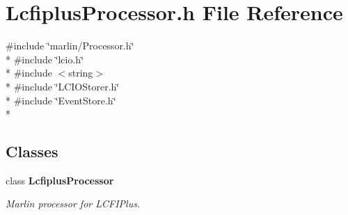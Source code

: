 \section{Lcfiplus\-Processor.\-h File Reference}
\label{LcfiplusProcessor_8h}
{\ttfamily \#include \char`\"{}marlin/\-Processor.\-h\char`\"{}}\\*
{\ttfamily \#include \char`\"{}lcio.\-h\char`\"{}}\\*
{\ttfamily \#include $<$string$>$}\\*
{\ttfamily \#include \char`\"{}L\-C\-I\-O\-Storer.\-h\char`\"{}}\\*
{\ttfamily \#include \char`\"{}Event\-Store.\-h\char`\"{}}\\*
\subsection*{Classes}
\begin{DoxyCompactItemize}
\item 
class {\bf Lcfiplus\-Processor}
\begin{DoxyCompactList}\small\item\em Marlin processor for L\-C\-F\-I\-Plus. \end{DoxyCompactList}\end{DoxyCompactItemize}
